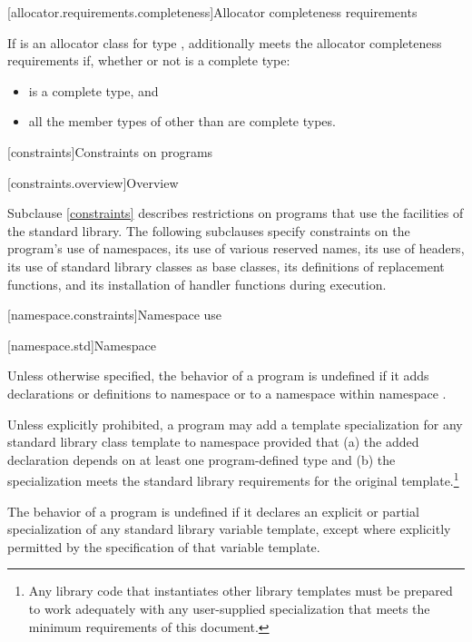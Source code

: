 [allocator.requirements.completeness]{Allocator completeness requirements}

\pnum
If  is an allocator class for type ,
 additionally meets the allocator completeness requirements if,
whether or not  is a complete type:

\begin{itemize}
\item {} is a complete type, and
\item all the member types of 
  other than  are complete types.
\end{itemize}

[constraints]{Constraints on programs}

[constraints.overview]{Overview}

\pnum
Subclause \ref{constraints} describes restrictions on \Cpp{} programs that use the facilities of
the \Cpp{} standard library. The following subclauses specify constraints on the
program's use of namespaces, its use of various reserved
names, its use of headers, its use of
standard library classes as base classes, its
definitions of replacement functions, and its
installation of handler functions during execution.

[namespace.constraints]{Namespace use}

[namespace.std]{Namespace }

\pnum
Unless otherwise specified,
the behavior of a \Cpp{} program is undefined if it adds declarations or definitions to namespace
or to a namespace within namespace
.

\pnum
Unless explicitly prohibited,
a program may add a template specialization for
any standard library class template
to namespace
 provided that
(a) the added declaration
depends on at least one program-defined type
and
(b) the specialization meets the standard library requirements
for the original template.\footnote{Any
library code that instantiates other library templates
must be prepared to work adequately with any user-supplied specialization
that meets the minimum requirements of this document.}

\pnum
The behavior of a \Cpp{} program is undefined
if it declares an explicit or partial specialization
of any standard library variable template,
except where explicitly permitted by the specification of that variable template.

